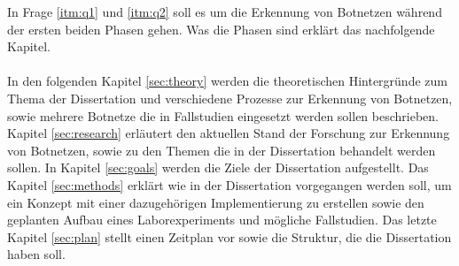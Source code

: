 In Frage \ref{itm:q1} und \ref{itm:q2} soll es um die Erkennung von Botnetzen während der ersten beiden Phasen gehen. Was die Phasen sind erklärt das nachfolgende Kapitel. 
\\ \\
In den folgenden Kapitel \ref{sec:theory} werden die theoretischen Hintergründe zum Thema der Dissertation und verschiedene Prozesse zur Erkennung von Botnetzen, sowie 
mehrere Botnetze die in Fallstudien eingesetzt werden sollen beschrieben. Kapitel \ref{sec:research} erläutert den aktuellen Stand der Forschung zur Erkennung von Botnetzen,
sowie zu den Themen die in der Dissertation behandelt werden sollen. In Kapitel \ref{sec:goals} werden die Ziele der Dissertation aufgestellt. Das Kapitel \ref{sec:methods}
erklärt wie in der Dissertation vorgegangen werden soll, um ein Konzept mit einer dazugehörigen Implementierung zu erstellen sowie den geplanten Aufbau eines Laborexperiments
und mögliche Fallstudien. Das letzte Kapitel \ref{sec:plan} stellt einen Zeitplan vor sowie die Struktur, die die Dissertation haben soll.